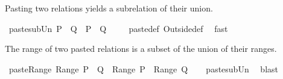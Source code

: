 \begin{isabellebody}
%
\begin{isamarkuptext}%
Pasting two relations yields a subrelation of their union.%
\end{isamarkuptext}%
\isamarkuptrue%
\isamarkupfalse%
\ paste{\isacharunderscore}sub{\isacharunderscore}Un{\isacharcolon}\ {\isachardoublequoteopen}P\ {\isacharplus}{\isacharasterisk}\ Q\ {\isasymsubseteq}\ P\ {\isasymunion}\ Q{\isachardoublequoteclose}\ \isanewline
%
\isadelimproof
\ \ %
\endisadelimproof
%
\isatagproof
{}\isamarkupfalse%
\ paste{\isacharunderscore}def\ Outside{\isacharunderscore}def\ \isamarkupfalse%
\ fast%
\endisatagproof
{\isafoldproof}%
%
\isadelimproof
%
\endisadelimproof
%
\begin{isamarkuptext}%
The range of two pasted relations is a subset of the union of their ranges.%
\end{isamarkuptext}%
\isamarkuptrue%
\isamarkupfalse%
\ paste{\isacharunderscore}Range{\isacharcolon}\ {\isachardoublequoteopen}Range\ {\isacharparenleft}P\ {\isacharplus}{\isacharasterisk}\ Q{\isacharparenright}\ {\isasymsubseteq}\ Range\ P\ {\isasymunion}\ Range\ Q{\isachardoublequoteclose}\isanewline
%
\isadelimproof
\ \ %
\endisadelimproof
%
\isatagproof
{}\isamarkupfalse%
\ paste{\isacharunderscore}sub{\isacharunderscore}Un\ \isamarkupfalse%
\ blast%
\endisatagproof
{\isafoldproof}%
%
\isadelimproof
\isanewline
%
\endisadelimproof
%
\isadelimtheory
%
\endisadelimtheory
%
\isatagtheory
{}\isamarkupfalse%
%
\endisatagtheory
{\isafoldtheory}%
%
\isadelimtheory
%
\endisadelimtheory
\end{isabellebody}%
